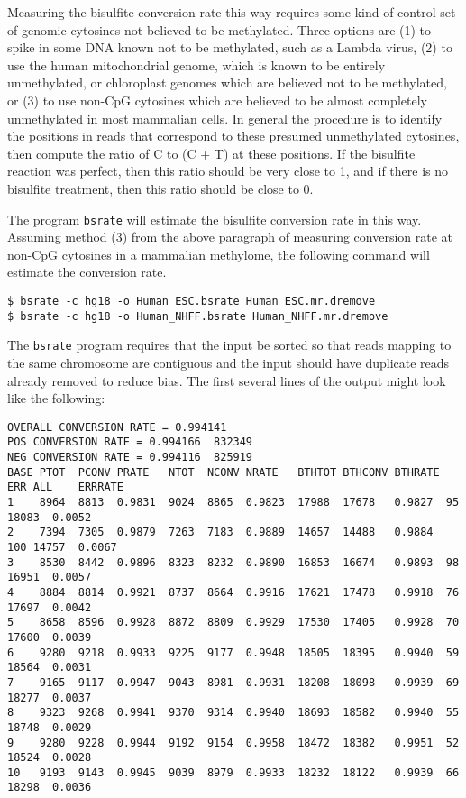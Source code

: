 \documentclass[10pt]{article}
\newcommand{\prog}[1]{\texttt{#1}}
\begin{document}
Measuring the bisulfite conversion rate this way requires some kind of
control set of genomic cytosines not believed to be methylated. Three
options are (1) to spike in some DNA known not to be methylated, such
as a Lambda virus, (2) to use the human mitochondrial genome, which
is known to be entirely unmethylated, or chloroplast genomes
which are believed not to be methylated, or (3) to use non-CpG cytosines
which are believed to be almost completely unmethylated in most
mammalian cells. In general the procedure is to identify the positions
in reads that correspond to these presumed unmethylated cytosines,
then compute the ratio of C to (C + T) at these positions. If the
bisulfite reaction was perfect, then this ratio should be very close
to 1, and if there is no bisulfite treatment, then this ratio should
be close to 0.

The program \prog{bsrate} will estimate the bisulfite conversion rate
in this way. Assuming method (3) from the above paragraph of measuring
conversion rate at non-CpG cytosines in a mammalian methylome, the
following command will estimate the conversion rate.
\begin{verbatim}
$ bsrate -c hg18 -o Human_ESC.bsrate Human_ESC.mr.dremove
$ bsrate -c hg18 -o Human_NHFF.bsrate Human_NHFF.mr.dremove
\end{verbatim}
The \prog{bsrate} program requires that the input be sorted so that
reads mapping to the same chromosome are contiguous and the input should
have duplicate reads already removed to reduce bias. The first several
lines of the output might look like the following:
{\small{%
\begin{verbatim}
OVERALL CONVERSION RATE = 0.994141
POS CONVERSION RATE = 0.994166  832349
NEG CONVERSION RATE = 0.994116  825919
BASE PTOT  PCONV PRATE   NTOT  NCONV NRATE   BTHTOT BTHCONV BTHRATE ERR ALL    ERRRATE
1    8964  8813  0.9831  9024  8865  0.9823  17988  17678   0.9827  95  18083  0.0052
2    7394  7305  0.9879  7263  7183  0.9889  14657  14488   0.9884  100 14757  0.0067
3    8530  8442  0.9896  8323  8232  0.9890  16853  16674   0.9893  98  16951  0.0057
4    8884  8814  0.9921  8737  8664  0.9916  17621  17478   0.9918  76  17697  0.0042
5    8658  8596  0.9928  8872  8809  0.9929  17530  17405   0.9928  70  17600  0.0039
6    9280  9218  0.9933  9225  9177  0.9948  18505  18395   0.9940  59  18564  0.0031
7    9165  9117  0.9947  9043  8981  0.9931  18208  18098   0.9939  69  18277  0.0037
8    9323  9268  0.9941  9370  9314  0.9940  18693  18582   0.9940  55  18748  0.0029
9    9280  9228  0.9944  9192  9154  0.9958  18472  18382   0.9951  52  18524  0.0028
10   9193  9143  0.9945  9039  8979  0.9933  18232  18122   0.9939  66  18298  0.0036
\end{verbatim}%
}}
\end{document}
